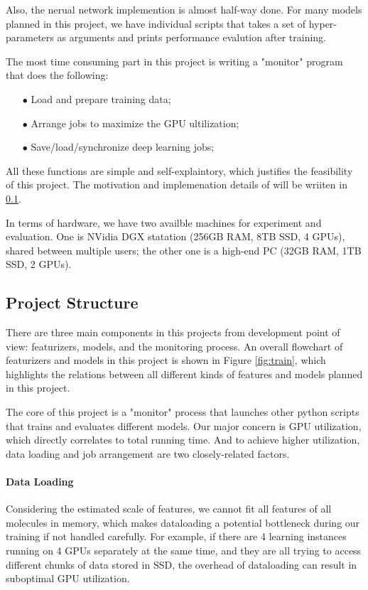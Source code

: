 \documentclass[conference]{IEEEtran}
\begin{document}
Also, the nerual network implemention is almost half-way done. 
For many models planned in this project, we have individual scripts that takes a set of hyper-parameters as arguments and prints performance evalution after training. 

The most time consuming part in this project is writing a "monitor" program that does the following:
\begin{itemize}
	\item[$\bullet$]  Load and prepare training data;
	\item[$\bullet$]  Arrange jobs to maximize the GPU ultilization;
	\item[$\bullet$]  Save/load/synchronize deep learning jobs; 
\end{itemize}
All these functions are simple and self-explaintory, which justifies the feasibility of this project. 
The motivation and implemenation details of will be wriiten in \ref{subsec_struct}.

In terms of hardware, we have two availble machines for experiment and evaluation. 
One is NVidia DGX statation (256GB RAM, 8TB SSD, 4 GPUs), shared between multiple users; the other one is a high-end PC (32GB RAM, 1TB SSD, 2 GPUs). 

\subsection{Project Structure} \label{subsec_struct}

There are three main components in this projects from development point of view: featurizers, models, and the monitoring process. 
An overall flowchart of featurizers and models in this project is shown in Figure \ref{fig:train}, which highlights the relations between all different kinds of features and models planned in this project. 

The core of this project is a "monitor" process that launches other python scripts that trains and evaluates different models. 
Our major concern is GPU utilization, which directly correlates to total running time. 
And to achieve higher utilization, data loading and job arrangement are two closely-related factors. 

\paragraph{Data Loading} 

Considering the estimated scale of features, we cannot fit all features of all molecules in memory, which makes dataloading a potential bottleneck during our training if not handled carefully. 
For example, if there are 4 learning instances running on 4 GPUs separately at the same time, and they are all trying to access different chunks of data stored in SSD, the overhead of dataloading can result in suboptimal GPU utilization. 
\end{document}
